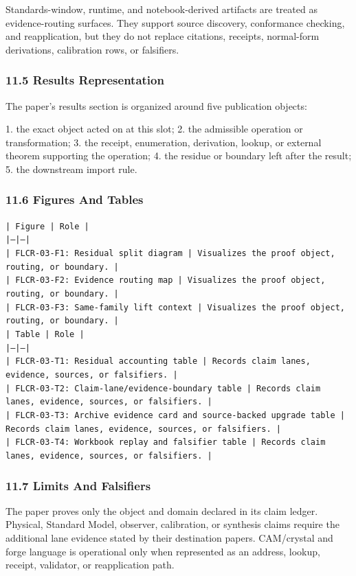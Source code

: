 \documentclass[11pt]{article}
\begin{document}
Standards-window, runtime, and notebook-derived artifacts are treated
as evidence-routing surfaces. They support source discovery, conformance
checking, and reapplication, but they do not replace citations, receipts,
normal-form derivations, calibration rows, or falsifiers.

\subsubsection*{11.5 Results Representation}

The paper's results section is organized around five publication objects:

1. the exact object acted on at this slot;
2. the admissible operation or transformation;
3. the receipt, enumeration, derivation, lookup, or external theorem supporting
   the operation;
4. the residue or boundary left after the result;
5. the downstream import rule.

\subsubsection*{11.6 Figures And Tables}

\noindent\texttt{| Figure | Role |}\\
\noindent\texttt{|---|---|}\\
\noindent\texttt{| FLCR-03-F1: Residual split diagram | Visualizes the proof object, routing, or boundary. |}\\
\noindent\texttt{| FLCR-03-F2: Evidence routing map | Visualizes the proof object, routing, or boundary. |}\\
\noindent\texttt{| FLCR-03-F3: Same-family lift context | Visualizes the proof object, routing, or boundary. |}\\

\noindent\texttt{| Table | Role |}\\
\noindent\texttt{|---|---|}\\
\noindent\texttt{| FLCR-03-T1: Residual accounting table | Records claim lanes, evidence, sources, or falsifiers. |}\\
\noindent\texttt{| FLCR-03-T2: Claim-lane/evidence-boundary table | Records claim lanes, evidence, sources, or falsifiers. |}\\
\noindent\texttt{| FLCR-03-T3: Archive evidence card and source-backed upgrade table | Records claim lanes, evidence, sources, or falsifiers. |}\\
\noindent\texttt{| FLCR-03-T4: Workbook replay and falsifier table | Records claim lanes, evidence, sources, or falsifiers. |}\\

\subsubsection*{11.7 Limits And Falsifiers}

The paper proves only the object and domain declared in its claim ledger.
Physical, Standard Model, observer, calibration, or synthesis claims require
the additional lane evidence stated by their destination papers. CAM/crystal
and forge language is operational only when represented as an address, lookup,
receipt, validator, or reapplication path.
\end{document}
